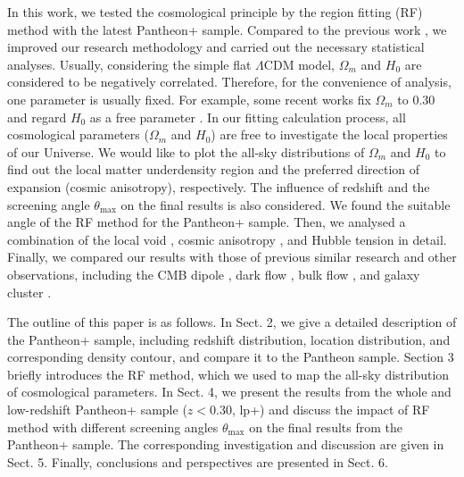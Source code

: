\documentclass{aa}
\def\tm{$\theta_\mathrm{max}$ }
\begin{document}
In this work, we tested the cosmological principle by the region fitting (RF) method with the latest Pantheon+ sample. Compared to the previous work \citep{2021CQGra..38r4001K,2022PhRvD.105f3514K,2023arXiv230402718M}, we improved our research methodology and carried out the necessary statistical analyses. Usually, considering the simple flat $\Lambda$CDM model, $\Omega_{m}$ and $H_{0}$ are considered to be negatively correlated. Therefore, for the convenience of analysis, one parameter is usually fixed. For example, some recent works fix $\Omega_{m}$ to 0.30 and regard $H_{0}$ as a free parameter \citep{2021CQGra..38r4001K,2022PhRvD.105f3514K,2023arXiv230402718M}. In our fitting calculation process, all cosmological parameters ($\Omega_{m}$ and $H_{0}$) are free to investigate the local properties of our Universe. We would like to plot the all-sky distributions of $\Omega_{m}$ and $H_{0}$ to find out the local matter underdensity region and the preferred direction of expansion (cosmic anisotropy), respectively. The influence of redshift and the screening angle \tm on the final results is also considered. We found the suitable angle of the RF method for the Pantheon+ sample. Then, we analysed a combination of the local void \citep{2008GReGr..40..451E,2008JCAP...04..003G,2013ApJ...775...62K,2013MNRAS.432.3025W,2016ApJ...818..173H,2022A&A...658A..20H,2023ApJ...952...59S}, cosmic anisotropy \citep{2019EPJC...79..783S,2020PhRvD.102l4059A,2020A&A...636A..15M,2021AA...649A.151M,2022JPhCS2191a2001A,2022A&A...668A..34H,2022MNRAS.514..139R,2023PDU....3901162A,2023MNRAS.519.4841D,2023arXiv230516177E}, and Hubble tension \citep{2019NatAs...3..384C,2019ApJ...876...85R,2019NatAs...3..891V,2020A&A...641A...6P,2020NatRP...2...10R,2022ApJ...934L...7R,2023PDU....4001201C} in detail. Finally, we compared our results with those of previous similar research \citep{2010JCAP...12..012A,2012JCAP...02..004C,2013AA...553A..56K,2014MNRAS.443.1680W,2014MNRAS.437.1840Y,2015MNRAS.446.2952C,2016MNRAS.456.1881L,2019MNRAS.486.1658C,2020A&A...643A..93H,2022PhRvD.105j3510L,2023arXiv230402718M} and other observations, including the CMB dipole \citep{2016AA...594A...1P,2020AA...641A...1P}, dark flow \citep{2022JHEAp..34...49A}, bulk flow \citep{2012MNRAS.420..447T,2017MNRAS.468.1420F,2023MNRAS.524.1885W}, and galaxy cluster \citep{2021AA...649A.151M}.



The outline of this paper is as follows. In Sect. 2, we give a detailed description of the Pantheon+ sample, including redshift distribution, location distribution, and corresponding density contour, and compare it to the Pantheon sample. Section 3 briefly introduces the RF method, which we used to map the all-sky distribution of cosmological parameters. In Sect. 4, we present the results from the whole and low-redshift Pantheon+ sample ($z < 0.30$, lp+) and discuss the impact of RF method with different screening angles \tm on the final results from the Pantheon+ sample. The corresponding investigation and discussion are given in Sect. 5. Finally, conclusions and perspectives are presented in Sect. 6.
\end{document}
